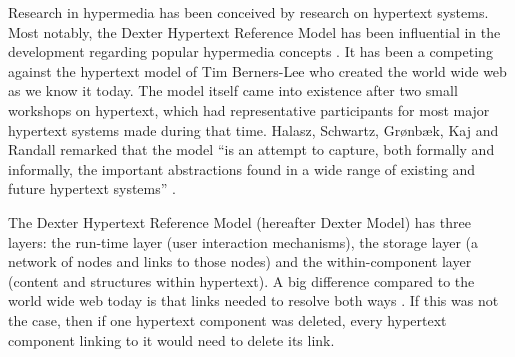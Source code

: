 Research in hypermedia has been conceived by research on hypertext systems. Most notably, the Dexter Hypertext Reference Model has been influential in the development regarding popular hypermedia concepts \cite{hardman1994}. It has been a competing against the hypertext model of Tim Berners-Lee who created the world wide web as we know it today. The model itself came into existence after two small workshops on hypertext, which had representative participants for most major hypertext systems made during that time. Halasz, Schwartz, Gr{\o}nb{\ae}k, Kaj and Randall remarked that the model ``is an attempt to capture, both formally and informally, the important abstractions found in a wide range of existing and future hypertext systems'' \cite{halasz1994}. 

The Dexter Hypertext Reference Model (hereafter Dexter Model) has three layers: the run-time layer (user interaction mechanisms), the storage layer (a network of nodes and links to those nodes) and the within-component layer (content and structures within hypertext)\cite{halasz1994}. A big difference compared to the world wide web today is that links needed to resolve both ways \cite{fisher2007}. If this was not the case, then if one hypertext component was deleted, every hypertext component linking to it would need to delete its link. 




